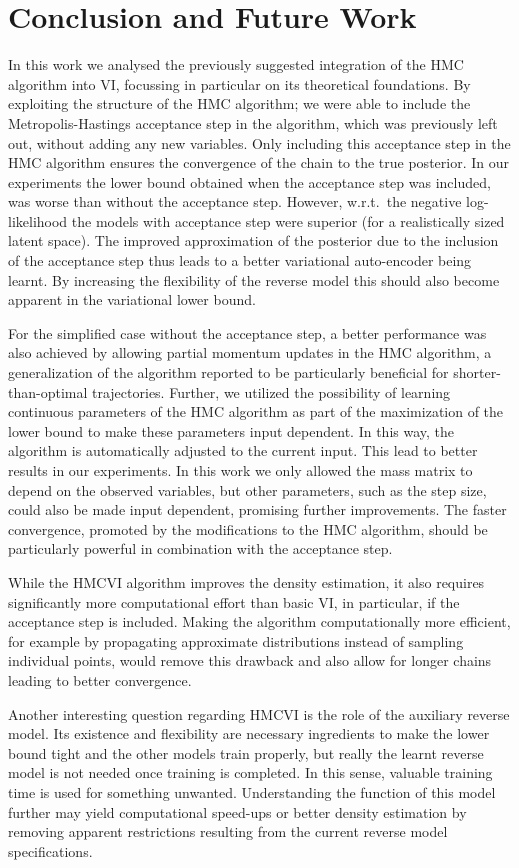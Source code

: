 \section{Conclusion and Future Work}
\label{sec:ConclAndFuture}
In this work we analysed the previously suggested integration of the HMC algorithm into VI, focussing in particular on its theoretical foundations. By exploiting the structure of the HMC algorithm; we were able to include the Metropolis-Hastings acceptance step in the algorithm, which was previously left out, without adding any new variables. Only including this acceptance step in the HMC algorithm ensures the convergence of the chain to the true posterior. In our experiments the lower bound obtained when the acceptance step was included, was worse than without the acceptance step. However, w.r.t.\ the negative log-likelihood the models with acceptance step were superior (for a realistically sized latent space). The improved approximation of the posterior due to the inclusion of the acceptance step thus leads to a better variational auto-encoder being learnt. By increasing the flexibility of the reverse model this should also become apparent in the variational lower bound.

For the simplified case without the acceptance step, a better performance was also achieved by allowing partial momentum updates in the HMC algorithm, a generalization of the algorithm reported to be particularly beneficial for shorter-than-optimal trajectories. Further, we utilized the possibility of learning continuous parameters of the HMC algorithm as part of the maximization of the lower bound to make these parameters input dependent. In this way, the algorithm is automatically adjusted to the current input. This lead to better results in our experiments. In this work we only allowed the mass matrix to depend on the observed variables, but other parameters, such as the step size, could also be made input dependent, promising further improvements. The faster convergence, promoted by the modifications to the HMC algorithm, should be particularly powerful in combination with the acceptance step.

While the HMCVI algorithm improves the density estimation, it also requires significantly more computational effort than basic VI, in particular, if the acceptance step is included. Making the algorithm computationally more efficient, for example by propagating approximate distributions instead of sampling individual points, would remove this drawback and also allow for longer chains leading to better convergence.

Another interesting question regarding HMCVI is the role of the auxiliary reverse model. Its existence and flexibility are necessary ingredients to make the lower bound tight and the other models train properly, but really the learnt reverse model is not needed once training is completed. In this sense, valuable training time is used for something unwanted. Understanding the function of this model further may yield computational speed-ups or better density estimation by removing apparent restrictions resulting from the current reverse model specifications.